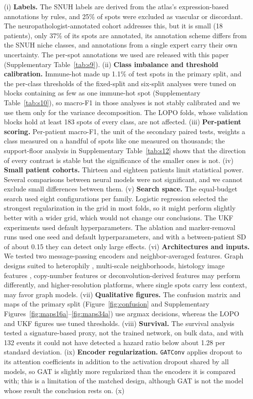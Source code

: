 \documentclass[11pt,letterpaper]{article}
\begin{document}
(i) \textbf{Labels.} The SNUH labels are derived from the atlas's expression-based annotations by rules, and 25\% of spots were excluded as vascular or discordant. The neuropathologist-annotated cohort addresses this, but it is small (18 patients), only 37\% of its spots are annotated, its annotation scheme differs from the SNUH niche classes, and annotations from a single expert carry their own uncertainty. The per-spot annotations we used are released with this paper (Supplementary Table~\ref{tab:s9}). (ii) \textbf{Class imbalance and threshold calibration.} Immune-hot made up 1.1\% of test spots in the primary split, and the per-class thresholds of the fixed-split and six-split analyses were tuned on blocks containing as few as one immune-hot spot (Supplementary Table~\ref{tab:s10}), so macro-F1 in those analyses is not stably calibrated and we use them only for the variance decomposition. The LOPO folds, whose validation blocks hold at least 183 spots of every class, are not affected. (iii) \textbf{Per-patient scoring.} Per-patient macro-F1, the unit of the secondary paired tests, weights a class measured on a handful of spots like one measured on thousands; the support-floor analysis in Supplementary Table~\ref{tab:s12} shows that the direction of every contrast is stable but the significance of the smaller ones is not. (iv) \textbf{Small patient cohorts.} Thirteen and eighteen patients limit statistical power. Several comparisons between neural models were not significant, and we cannot exclude small differences between them. (v) \textbf{Search space.} The equal-budget search used eight configurations per family. Logistic regression selected the strongest regularization in the grid in most folds, so it might perform slightly better with a wider grid, which would not change our conclusions. The UKF experiments used default hyperparameters. The ablation and marker-removal runs used one seed and default hyperparameters, and with a between-patient SD of about 0.15 they can detect only large effects. (vi) \textbf{Architectures and inputs.} We tested two message-passing encoders and neighbor-averaged features. Graph designs suited to heterophily \cite{zhu2020homophily}, multi-scale neighborhoods, histology image features \cite{hu2021spagcn}, copy-number features \cite{ritter2025} or deconvolution-derived features \cite{kleshchevnikov2022} may perform differently, and higher-resolution platforms, where single spots carry less context, may favor graph models. (vii) \textbf{Qualitative figures.} The confusion matrix and maps of the primary split (Figure~\ref{fig:confusion} and Supplementary Figures~\ref{fig:maps16a}--\ref{fig:maps34a}) use argmax decisions, whereas the LOPO and UKF figures use tuned thresholds. (viii) \textbf{Survival.} The survival analysis tested a signature-based proxy, not the trained network, on bulk data, and with 132 events it could not have detected a hazard ratio below about 1.28 per standard deviation. (ix) \textbf{Encoder regularization.} \texttt{GATConv} applies dropout to its attention coefficients in addition to the activation dropout shared by all models, so GAT is slightly more regularized than the encoders it is compared with; this is a limitation of the matched design, although GAT is not the model whose result the conclusion rests on. (x) 
\end{document}

